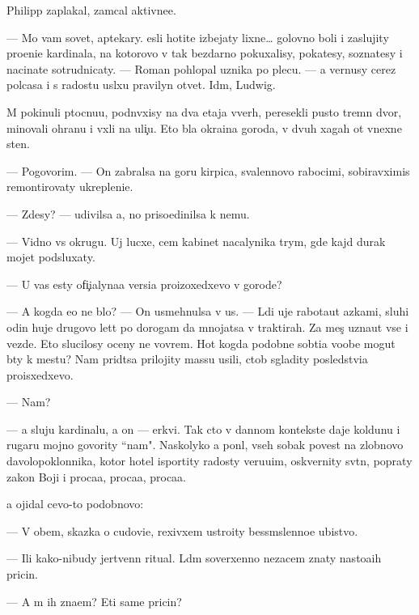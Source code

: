 \documentclass[10pt]{book}
\begin{document}
Philipp zaplakal, zam{\yi}cal aktivne{\y}e.

— Mo{\y} vam sovet, aptekary. {\Y}esli hotite izbejaty lixne{\y}… golovno{\y} boli i zaslujity pro{\x}eni{\y}e kardinala, na kotorovo v{\yi} tak bezdarno pokuxalisy, poka{\y}tesy, sozna{\y}tesy i nacina{\y}te sotrudnicaty. — Roman pohlopal uznika po plecu. — {\Y}a vernusy cerez polcasa i s radost{\y}u usl{\yi}xu pravilyn{\yi}{\y} otvet. Id{\e}m, Ludwig.

M{\yi} pokinuli p{\yi}tocnu{\y}u, podn{\ia}vxisy na dva etaja vverh, peresekli pusto{\y} t{\iu}remn{\yi}{\y} dvor, minovali ohranu i v{\yi}xli na uli{\c}u. Eto b{\yi}la okra{\y}ina goroda, v dvuh xagah ot vnexne{\y} sten{\yi}.

— Pogovorim. — On zabralsa na goru kirpica, svalennovo rabocimi, sobiravximis{\ia} remontirovaty ukrepleni{\y}e.

— Zdesy? — udivilsa {\y}a, no priso{\y}edinilsa k nemu.

— Vidno vs{\iu} okrugu. Uj lucxe, cem kabinet nacalynika t{\iu}rym{\yi}, gde kajd{\yi}{\y} durak mojet podsluxaty.

— U vas {\y}esty ofi{\c}ialyna{\y}a versi{\y}a proizoxedxevo v gorode?

— A kogda {\y}e{\y}o ne b{\yi}lo? — On usmehnulsa v us{\yi}. — L{\iu}di uje rabota{\y}ut {\y}az{\yi}kami, sluhi odin huje drugovo let{\ia}t po dorogam da mnojatsa v traktirah. Za mes{\ia}{\c} uzna{\y}ut vse i vezde. Eto slucilosy oceny ne vovrem{\ia}. Hot{\ia} kogda podobn{\yi}{\y}e sob{\yi}ti{\y}a voob{\x}e mogut b{\yi}ty k mestu? Nam prid{\e}tsa prilojity massu usili{\y}, ctob{\yi} sgladity posledstvi{\y}a proisxedxevo.

— Nam?

— {\Y}a sluju kardinalu, a on — {\C}erkvi. Tak cto v dannom kontekste daje koldunu i rugaru mojno govority ``nam". Naskolyko {\y}a pon{\ia}l, vseh sobak poves{\ia}t na zlobnovo d{\y}avolopoklonnika, kotor{\yi}{\y} hotel isportity radosty veru{\y}u{\x}im, oskvernity sv{\ia}t{\yi}n{\iu}, popraty zakon{\yi} Boj{\yf}i i proca{\y}a, proca{\y}a, proca{\y}a.

{\Y}a ojidal cevo-to podobnovo:

— V ob{\x}em, skazka o cudovi{\x}e, rexivxem ustro{\y}ity bessm{\yi}slenno{\y}e ubi{\y}stvo.

— Ili kako{\y}-nibudy jertvenn{\yi}{\y} ritual. L{\iu}d{\ia}m soverxenno nezacem znaty nasto{\y}a{\x}ih pricin.

— A m{\yi} ih zna{\y}em? Eti sam{\yi}{\y}e pricin{\yi}?
\end{document}
